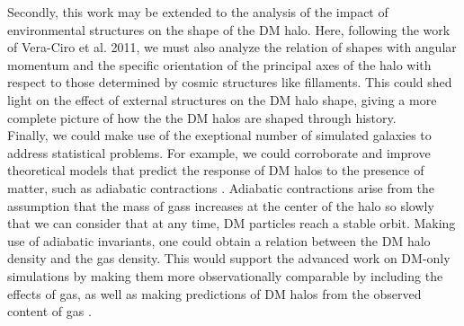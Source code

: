 Secondly, this work may be extended to the analysis of the impact of environmental structures on the shape of the DM halo. Here, following the work of Vera-Ciro et al. 2011, we must also analyze the relation of shapes with angular momentum and the specific orientation of the principal axes of the halo with respect to those determined by cosmic structures like fillaments. This could shed light on the effect of external structures on the DM halo shape, giving a more complete picture of how the the DM halos are shaped through history.\\


Finally, we could make use of the exeptional number of simulated galaxies to address statistical problems. For example, we could corroborate and improve theoretical models that predict the response of DM halos to the presence of matter, such as adiabatic contractions \cite{}. Adiabatic contractions arise from the assumption that the mass of gass increases at the center of the halo so slowly that we can consider that at any time, DM particles reach a stable orbit. Making use of adiabatic invariants, one could obtain a relation between the DM halo density and the gas density. This would support the advanced work on DM-only simulations by making them more observationally comparable by including the effects of gas, as well as making predictions of DM halos from the observed content of gas \cite{}.\\




 
 
